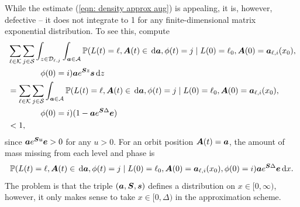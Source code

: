 While the estimate (\ref{eqn: density approx aug}) is appealing, it is, however, defective -- it does not integrate to 1 for any finite-dimensional matrix exponential distribution. To see this, compute 
\begin{align*}
	&\sum_{\ell\in\mathcal K}\sum_{j\in\mathcal S}\int_{z\in\mathcal D_{\ell,j}}\displaystyle\int_{\boldsymbol a \in\mathcal A}\mathbb P(L(t) = \ell, \boldsymbol A(t)\in\, \mathrm{d} \boldsymbol a, \phi(t) = j\mid L(0)=\ell_0, \boldsymbol A(0) = \boldsymbol  a_{\ell,i}(x_0), 
	\\&\qquad{}\qquad{}\phi(0) = i) \boldsymbol a e^{ \boldsymbol{S}z} \boldsymbol s \, \mathrm{d} z
	\\&= \sum_{\ell\in\mathcal K}\sum_{j\in\mathcal S}\displaystyle\int_{\boldsymbol a \in\mathcal A}\mathbb P(L(t) = \ell, \boldsymbol A(t)\in\, \mathrm{d} \boldsymbol a, \phi(t) = j\mid L(0)=\ell_0, \boldsymbol A(0) = \boldsymbol  a_{\ell,i}(x_0), 
	\\&\qquad{}\qquad{}\phi(0) = i) (1-\boldsymbol a e^{ \boldsymbol{S}\Delta}\boldsymbol e  )
	\\&<1,
\end{align*}
since \(\boldsymbol a e^{\boldsymbol{S}u} \boldsymbol e>0\) for any \(u>0\). For an orbit position \(\boldsymbol A(t)=\boldsymbol a\), the amount of mass missing from each level and phase is 
\[\mathbb P(L(t) = \ell, \boldsymbol A(t)\in\, \mathrm{d} \boldsymbol a,\phi(t) = j\mid L(0)=\ell_0, \boldsymbol A(0) = \boldsymbol  a_{\ell,i}(x_0), \phi(0) = i) \boldsymbol a e^{\boldsymbol{S}\Delta} \boldsymbol e \, \mathrm{d} x.\]
The problem is that the triple \((\boldsymbol a,\boldsymbol S, \boldsymbol s)\) defines a distribution on \(x\in[0,\infty)\), however, it only makes sense to take \(x\in[0,\Delta)\) in the approximation scheme.


